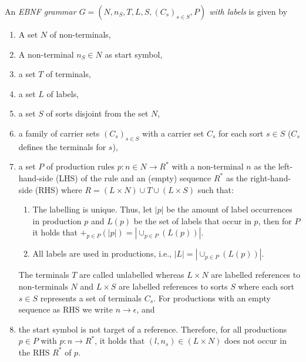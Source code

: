 \begin{definition}
\label{def:sec-compl-software-trans:ebnf}
An \emph{EBNF grammar $G=(N,n_S,T,L,S,(C_s)_{s \in S},P)$ with labels} is given by
\begin{enumerate}
  \item A set $N$ of non-terminals,
  \item A non-terminal $n_S \in N$ as start symbol,
  \item a set $T$ of terminals,
  \item a set $L$ of labels,
  \item \label{item:sec-compl-software-trans:ebnfA5}a set $S$ of sorts disjoint from the set $N$,
  \item a family of carrier sets $(C_s)_{s \in S}$ with a carrier set $C_s$ for each sort $s \in S$ ($C_s$ defines the terminals for $s$),
  \item a set $P$ of production rules $p\colon n \in N \to R^*$ with a non-terminal $n$ as the left-hand-side (LHS) of the rule and an (empty) sequence $R^*$ as the right-hand-side (RHS) where $R=(L \times N) \cup T \cup (L \times S)$ such that:
  \begin{enumerate}
    \item \label{item:sec-compl-software-trans:ebnfA1}The labelling is unique.
    Thus, let $|p|$ be the amount of label occurrences in production $p$ and $L(p)$ be the set of labels that occur in $p$, then for $P$ it holds that $+_{p \in P} (|p|)=|\cup_{p \in P} (L(p))|$.
    \item \label{item:sec-compl-software-trans:ebnfA2}All labels are used in productions, i.e., $|L|=|\cup_{p \in P} (L(p))|$.
  \end{enumerate} 
    
  The terminals $T$ are called unlabelled whereas $L \times N$ are labelled references to non-terminals $N$ and $L \times S$ are labelled references to sorts $S$ where each sort $s \in S$ represents a set of terminals $C_s$.
  For productions with an empty sequence as RHS we write $n \to \epsilon$, and
  \item \label{item:sec-compl-software-trans:ebnfA8}the start symbol is not target of a reference.
  Therefore, for all productions $p \in P$ with $p\colon n \to R^*$, it holds that $(l,n_s) \in (L \times N)$ does not occur in the RHS $R^*$ of $p$.\envEndMarker
\end{enumerate}
\end{definition}

